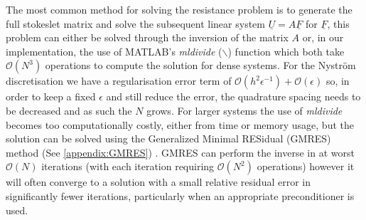 The most common method for solving the resistance problem is to generate the full stokeslet matrix and solve the subsequent linear system $\underline{U} = A\underline{F}$ for $\underline{F}$, this problem can either be solved through the inversion of the matrix $A$ or, in our implementation, the use of MATLAB's \textit{mldivide} ($\backslash$) function which both take $\mathcal{O}(N^3)$ operations to compute the solution for dense systems. For the Nyström discretisation we have a regularisation error term of $\mathcal{O}(h^2\epsilon^{-1})+\mathcal{O}(\epsilon)$ so, in order to keep a fixed $\epsilon$ and still reduce the error, the quadrature spacing needs to be decreased and as such the $N$ grows. For larger systems the use of \textit{mldivide} becomes too computationally costly, either from time or memory usage, but the solution can be solved using the Generalized Minimal RESidual (GMRES) method (See \cref{appendix:GMRES}) \cite{Saad1986GMRES:Systems,Elman2005FiniteDynamics}. GMRES can perform the inverse in at worst $\mathcal{O}(N)$ iterations (with each iteration requiring $\mathcal{O}(N^2)$ operations) however it will often converge to a solution with a small relative residual error in significantly fewer iterations, particularly when an appropriate preconditioner is used. 